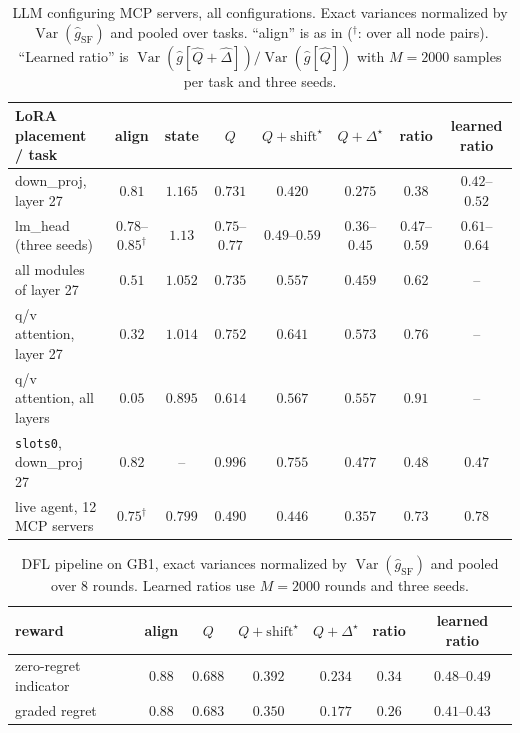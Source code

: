 \documentclass[10pt]{article}
\providecommand{\Var}{\operatorname{Var}}
\theoremstyle{plain}
\theoremstyle{definition}
\theoremstyle{remark}
\theoremstyle{definition}
\newcommand{\ghat}[1]{\hat g[#1]}            %
\newcommand{\rf}{\hat g_{\mathrm{SF}}}       %
\newcommand{\Dstar}{\Delta^{\star}}
\begin{document}
\begin{table}[h]
\centering\small
\caption{LLM configuring MCP servers, all configurations. Exact variances normalized by $\Var(\rf)$ and pooled over tasks. ``align'' is as in  ($^{\dagger}$: over all node pairs). ``Learned ratio'' is $\Var(\ghat{\hat Q+\hat\Delta})/\Var(\ghat{\hat Q})$ with $M=2000$ samples per task and three seeds.}
\label{tab:mcp-full}
\setlength{\tabcolsep}{4pt}
\begin{tabular}{lccccccc}
\toprule
LoRA placement / task & align & state & $Q$ & $Q{+}\mathrm{shift}^{\star}$ & $Q{+}\Dstar$ & ratio & learned ratio \\
\midrule
down\_proj, layer 27 & $0.81$ & $1.165$ & $0.731$ & $0.420$ & $0.275$ & $0.38$ & $0.42$--$0.52$ \\
lm\_head (three seeds) & $0.78$--$0.85^{\dagger}$ & $1.13$ & $0.75$--$0.77$ & $0.49$--$0.59$ & $0.36$--$0.45$ & $0.47$--$0.59$ & $0.61$--$0.64$ \\
all modules of layer 27 & $0.51$ & $1.052$ & $0.735$ & $0.557$ & $0.459$ & $0.62$ & -- \\
q/v attention, layer 27 & $0.32$ & $1.014$ & $0.752$ & $0.641$ & $0.573$ & $0.76$ & -- \\
q/v attention, all layers & $0.05$ & $0.895$ & $0.614$ & $0.567$ & $0.557$ & $0.91$ & -- \\
\midrule
\texttt{slots0}, down\_proj 27 & $0.82$ & -- & $0.996$ & $0.755$ & $0.477$ & $0.48$ & $0.47$ \\
live agent, 12 MCP servers & $0.75^{\dagger}$ & $0.799$ & $0.490$ & $0.446$ & $0.357$ & $0.73$ & $0.78$ \\
\bottomrule
\end{tabular}
\end{table}

\begin{table}[h]
\centering\small
\caption{DFL pipeline on GB1, exact variances normalized by $\Var(\rf)$ and pooled over $8$ rounds. Learned ratios use $M=2000$ rounds and three seeds.}
\label{tab:gb1}
\begin{tabular}{lcccccc}
\toprule
reward & align & $Q$ & $Q{+}\mathrm{shift}^{\star}$ & $Q{+}\Dstar$ & ratio & learned ratio \\
\midrule
zero-regret indicator & $0.88$ & $0.688$ & $0.392$ & $0.234$ & $0.34$ & $0.48$--$0.49$ \\
graded regret & $0.88$ & $0.683$ & $0.350$ & $0.177$ & $0.26$ & $0.41$--$0.43$ \\
\bottomrule
\end{tabular}
\end{table}
\end{document}
